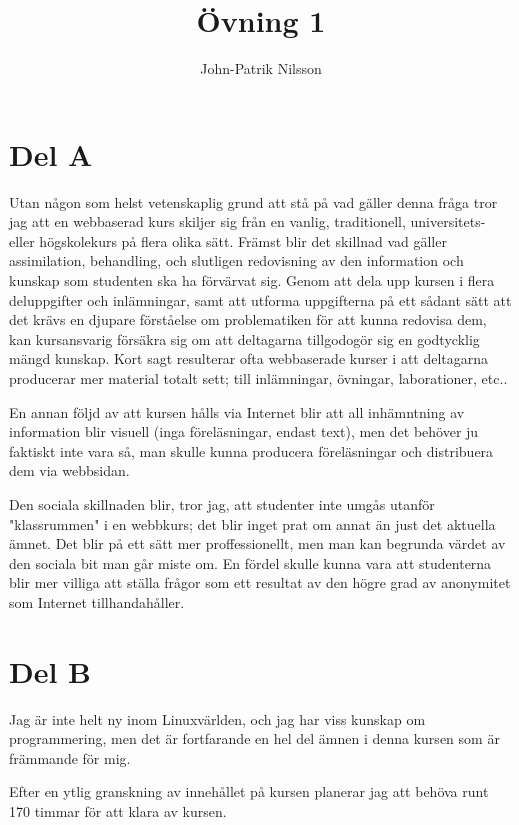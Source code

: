 \documentclass[a4paper,10pt]{article}
\title{Övning 1}
\author{John-Patrik Nilsson}
\begin{document}
\maketitle

\pagestyle{empty}
\thispagestyle{empty}

\section{Del A}
Utan någon som helst vetenskaplig grund att stå på vad gäller denna fråga tror jag att en webbaserad kurs skiljer sig från en vanlig, traditionell, universitets- eller högskolekurs på flera olika sätt. Främst blir det skillnad vad gäller assimilation, behandling, och slutligen redovisning av den information och kunskap som studenten ska ha förvärvat sig. Genom att dela upp kursen i flera deluppgifter och inlämningar, samt att utforma uppgifterna på ett sådant sätt att det krävs en djupare förståelse om problematiken för att kunna redovisa dem, kan kursansvarig försäkra sig om att deltagarna tillgodogör sig en godtycklig mängd kunskap. Kort sagt resulterar ofta webbaserade kurser i att deltagarna producerar mer material totalt sett; till inlämningar, övningar, laborationer, etc..

En annan följd av att kursen hålls via Internet blir att all inhämntning av information blir visuell (inga föreläsningar, endast text), men det behöver ju faktiskt inte vara så, man skulle kunna producera föreläsningar och distribuera dem via webbsidan.

Den sociala skillnaden blir, tror jag, att studenter inte umgås utanför "klassrummen" i en webbkurs; det blir inget prat om annat än just det aktuella ämnet. Det blir på ett sätt mer proffessionellt, men man kan begrunda värdet av den sociala bit man går miste om. En fördel skulle kunna vara att studenterna blir mer villiga att ställa frågor som ett resultat av den högre grad av anonymitet som Internet tillhandahåller.

\newpage
\section{Del B}
Jag är inte helt ny inom Linuxvärlden, och jag har viss kunskap om programmering, men det är fortfarande en hel del ämnen i denna kursen som är främmande för mig.

Efter en ytlig granskning av innehållet på kursen planerar jag att behöva runt 170 timmar för att klara av kursen. 
\end{document}
